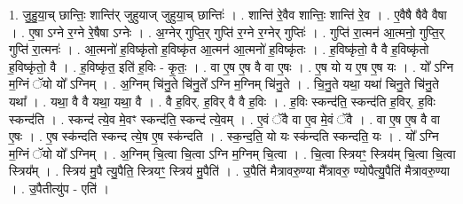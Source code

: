 \documentclass[17pt]{extarticle}
\begin{document}
1. जु॒हु॒या॒च् छान्तिः॒ शान्ति॑र् जुहुयाज् जुहुया॒च् छान्तिः॑ । . शान्ति॑ रे॒वैव शान्तिः॒ शान्ति॑ रे॒व । . ए॒वैषै षैवै वैषा । . ए॒षा ऽग्ने र॒ग्ने रे॒षैषा ऽग्नेः । . अ॒ग्नेर् गुप्ति॒र् गुप्ति॑ र॒ग्ने र॒ग्नेर् गुप्तिः॑ । . गुप्ति॑ रा॒त्मन॑ आ॒त्मनो॒ गुप्ति॒र् गुप्ति॑ रा॒त्मनः॑ । . आ॒त्मनो॑ ह॒विष्कृ॑तो ह॒विष्कृ॑त आ॒त्मन॑ आ॒त्मनो॑ ह॒विष्कृ॑तः । . ह॒विष्कृ॑तो॒ वै वै ह॒विष्कृ॑तो ह॒विष्कृ॑तो॒ वै । . ह॒विष्कृ॑त॒ इति॑ ह॒विः - कृ॒तः॒ । . वा ए॒ष ए॒ष वै वा ए॒षः । . ए॒ष यो य ए॒ष ए॒ष यः । . यो᳚ ऽग्नि म॒ग्निं ॅयो यो᳚ ऽग्निम् । . अ॒ग्निम् चि॑नु॒ते चि॑नु॒ते᳚ ऽग्नि म॒ग्निम् चि॑नु॒ते । . चि॒नु॒ते यथा॒ यथा॑ चिनु॒ते चि॑नु॒ते यथा᳚ । . यथा॒ वै वै यथा॒ यथा॒ वै । . वै ह॒विर्. ह॒विर् वै वै ह॒विः । . ह॒विः स्कन्द॑ति॒ स्कन्द॑ति ह॒विर्. ह॒विः स्कन्द॑ति । . स्कन्द॑ त्ये॒व मे॒वꣳ स्कन्द॑ति॒ स्कन्द॑ त्ये॒वम् । . ए॒वं ॅवै वा ए॒व मे॒वं ॅवै । . वा ए॒ष ए॒ष वै वा ए॒षः । . ए॒ष स्क॑न्दति स्कन्द त्ये॒ष ए॒ष स्क॑न्दति । . स्क॒न्द॒ति॒ यो यः स्क॑न्दति स्कन्दति॒ यः । . यो᳚ ऽग्नि म॒ग्निं ॅयो यो᳚ ऽग्निम् । . अ॒ग्निम् चि॒त्वा चि॒त्वा ऽग्नि म॒ग्निम् चि॒त्वा । . चि॒त्वा स्त्रियꣳ॒॒ स्त्रिय॑म् चि॒त्वा चि॒त्वा स्त्रिय᳚म् । . स्त्रिय॑ मु॒पै त्यु॒पैति॒ स्त्रियꣳ॒॒ स्त्रिय॑ मु॒पैति॑ । . उ॒पैति॑ मैत्रावरु॒ण्या मै᳚त्रावरु॒ ण्योपैत्यु॒पैति॑ मैत्रावरु॒ण्या । . उ॒पैतीत्यु॑प - एति॑ । \newline
\end{document}
